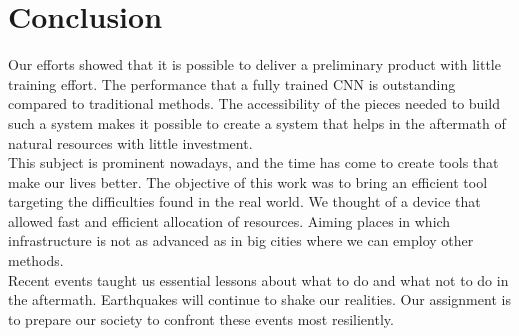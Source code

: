\section{Conclusion}

Our efforts showed that it is possible to deliver a preliminary product with little training effort. The performance that a fully trained CNN is outstanding compared to traditional methods. The accessibility of the pieces needed to build such a system makes it possible to create a system that helps in the aftermath of natural resources with little investment.\\

This subject is prominent nowadays, and the time has come to create tools that make our lives better. The objective of this work was to bring an efficient tool targeting the difficulties found in the real world. We thought of a device that allowed fast and efficient allocation of resources. Aiming places in which infrastructure is not as advanced as in big cities where we can employ other methods.\\

Recent events taught us essential lessons about what to do and what not to do in the aftermath. Earthquakes will continue to shake our realities. Our assignment is to prepare our society to confront these events most resiliently.\\
